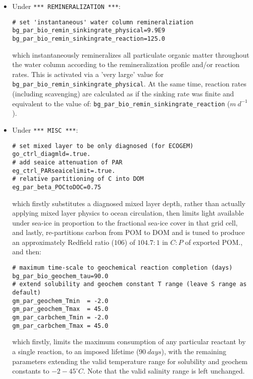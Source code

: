\documentclass[11pt,fleqn]{book} %
\begin{document}
\vspace{2mm}
\begin{itemize}[noitemsep]
\item Under \texttt{*** REMINERALIZATION ***}:
\small\vspace{-1mm}\begin{verbatim}
# set 'instantaneous' water column remineralziation
bg_par_bio_remin_sinkingrate_physical=9.9E9
bg_par_bio_remin_sinkingrate_reaction=125.0
\end{verbatim}\vspace{-1mm}\normalsize
which instantaneously remineralizes all particulate organic matter throughout the water column according to the remineralization profile and/or reaction rates. This is activated via a 'very large' value for  \texttt{bg\_par\_bio\_remin\_sinkingrate\_physical}. At the same time, reaction rates (including scavenging) are calculated as if the sinking rate was finite and equivalent to the value of: \texttt{bg\_par\_bio\_remin\_sinkingrate\_reaction} (\(m\:d^{-1}\)). 

\vspace{2mm}
\item Under \texttt{*** MISC ***}:
\small\vspace{-1mm}\begin{verbatim}
# set mixed layer to be only diagnosed (for ECOGEM)
go_ctrl_diagmld=.true.
# add seaice attenuation of PAR
eg_ctrl_PARseaicelimit=.true.
# relative partitioning of C into DOM
eg_par_beta_POCtoDOC=0.75
\end{verbatim}\vspace{-1mm}\normalsize
which firstly substitutes a diagnosed mixed layer depth, rather than actually applying mixed layer physics to ocean circulation, then limits light available under sea-ice in proportion to the fractional sea-ice cover in that grid cell, and lastly, re-partitions carbon from POM to DOM and is tuned to produce an approximately Redfield ratio (\(106\)) of \(104.7:1\) in \(C:P\) of exported POM., and then:
\small\vspace{-1mm}\begin{verbatim}
# maximum time-scale to geochemical reaction completion (days)
bg_par_bio_geochem_tau=90.0
# extend solubility and geochem constant T range (leave S range as default)
gm_par_geochem_Tmin  = -2.0
gm_par_geochem_Tmax  = 45.0
gm_par_carbchem_Tmin = -2.0
gm_par_carbchem_Tmax = 45.0
\end{verbatim}\vspace{-1mm}\normalsize
which firstly, limits the maximum consumption of any particular reactant by a single reaction, to an imposed lifetime (\(90\:days\)), with the remaining parameters extending the valid temperature range for solubility and geochem constants to \(-2 - 45^{\circ}C\). Note that the valid salinity range is left unchanged.


\end{itemize}
\end{document}
